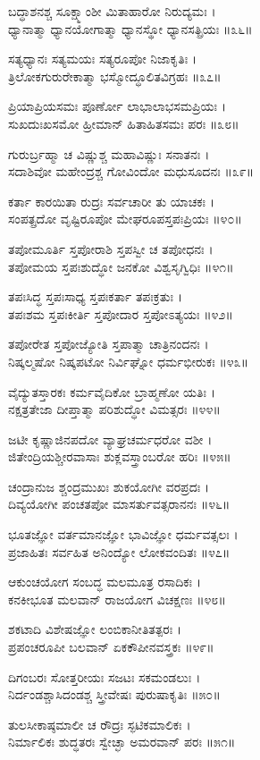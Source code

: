ಬದ್ಧಾಶನಶ್ಚ ಸೂಕ್ಷ್ಮಾಂಶೀ ಮಿತಾಹಾರೋ ನಿರುದ್ಯಮಃ ।\\
ಧ್ಯಾನಾತ್ಮಾ ಧ್ಯಾನಯೋಗಾತ್ಮಾ ಧ್ಯಾನಸ್ಥೋ ಧ್ಯಾನಸತ್ಪ್ರಿಯಃ ॥೩೬॥

ಸತ್ಯಧ್ಯಾನಃ ಸತ್ಯಮಯಃ ಸತ್ಯರೂಪೋ ನಿಜಾಕೃತಿಃ ।\\
ತ್ರಿಲೋಕಗುರುರೇಕಾತ್ಮಾ ಭಸ್ಮೋದ್ಧೂಲಿತವಿಗ್ರಹಃ ॥೩೭॥

ಪ್ರಿಯಾಪ್ರಿಯಸಮಃ ಪೂರ್ಣೋ ಲಾಭಾಲಾಭಸಮಪ್ರಿಯಃ ।\\
ಸುಖದುಃಖಸಮೋ ಹ್ರೀಮಾನ್ ಹಿತಾಹಿತಸಮಃ ಪರಃ ॥೩೮॥

ಗುರುರ್ಬ್ರಹ್ಮಾ ಚ ವಿಷ್ಣುಶ್ಚ ಮಹಾವಿಷ್ಣುಃ ಸನಾತನಃ ।\\
ಸದಾಶಿವೋ ಮಹೇಂದ್ರಶ್ಚ ಗೋವಿಂದೋ ಮಧುಸೂದನಃ ॥೩೯॥

ಕರ್ತಾ ಕಾರಯಿತಾ ರುದ್ರಃ ಸರ್ವಚಾರೀ ತು ಯಾಚಕಃ ।\\
ಸಂಪತ್ಪ್ರದೋ ವೃಷ್ಟಿರೂಪೋ ಮೇಘರೂಪಸ್ತಪಃಪ್ರಿಯಃ ॥೪೦॥

ತಪೋಮೂರ್ತಿ ಸ್ತಪೋರಾಶಿ ಸ್ತಪಸ್ವೀ ಚ ತಪೋಧನಃ ।\\
ತಪೋಮಯ ಸ್ತಪಃಶುದ್ಧೋ ಜನಕೋ ವಿಶ್ವಸೃಗ್ವಿಧಿಃ ॥೪೧॥

ತಪಃಸಿದ್ಧ ಸ್ತಪಃಸಾಧ್ಯ ಸ್ತಪಃಕರ್ತಾ ತಪಃಕ್ರತುಃ ।\\
ತಪಃಶಮ ಸ್ತಪಃಕೀರ್ತಿ ಸ್ತಪೋದಾರ ಸ್ತಪೋಽತ್ಯಯಃ ॥೪೨॥

ತಪೋರೇತ ಸ್ತಪೋಜ್ಯೋತಿ ಸ್ತಪಾತ್ಮಾ ಚಾತ್ರಿನಂದನಃ ।\\
ನಿಷ್ಕಲ್ಮಷೋ ನಿಷ್ಕಪಟೋ ನಿರ್ವಿಘ್ನೋ ಧರ್ಮಭೀರುಕಃ ॥೪೩॥

ವೈದ್ಯುತಸ್ತಾರಕಃ ಕರ್ಮವೈದಿಕೋ ಬ್ರಾಹ್ಮಣೋ ಯತಿಃ ।\\
ನಕ್ಷತ್ರತೇಜಾ ದೀಪ್ತಾತ್ಮಾ ಪರಿಶುದ್ಧೋ ವಿಮತ್ಸರಃ ॥೪೪॥

ಜಟೀ ಕೃಷ್ಣಾಜಿನಪದೋ ವ್ಯಾಘ್ರಚರ್ಮಧರೋ ವಶೀ ।\\
ಜಿತೇಂದ್ರಿಯಶ್ಚೀರವಾಸಾಃ ಶುಕ್ಲವಸ್ತ್ರಾಂಬರೋ ಹರಿಃ ॥೪೫॥

ಚಂದ್ರಾನುಜ ಶ್ಚಂದ್ರಮುಖಃ ಶುಕಯೋಗೀ ವರಪ್ರದಃ ।\\
ದಿವ್ಯಯೋಗೀ ಪಂಚತಪೋ ಮಾಸರ್ತುವತ್ಸರಾನನಃ ॥೪೬॥

ಭೂತಜ್ಞೋ ವರ್ತಮಾನಜ್ಞೋ ಭಾವಿಜ್ಞೋ ಧರ್ಮವತ್ಸಲಃ ।\\
ಪ್ರಜಾಹಿತಃ ಸರ್ವಹಿತ ಅನಿಂದ್ಯೋ ಲೋಕವಂದಿತಃ ॥೪೭॥

ಆಕುಂಚಯೋಗ ಸಂಬದ್ಧ ಮಲಮೂತ್ರ ರಸಾದಿಕಃ ।\\
ಕನಕೀಭೂತ ಮಲವಾನ್ ರಾಜಯೋಗ ವಿಚಕ್ಷಣಃ ॥೪೮॥

ಶಕಟಾದಿ ವಿಶೇಷಜ್ಞೋ ಲಂಬಿಕಾನೀತಿತತ್ಪರಃ ।\\
ಪ್ರಪಂಚರೂಪೀ ಬಲವಾನ್ ಏಕಕೌಪೀನವಸ್ತ್ರಕಃ ॥೪೯॥

ದಿಗಂಬರಃ ಸೋತ್ತರೀಯಃ ಸಜಟಃ ಸಕಮಂಡಲುಃ ।\\
ನಿರ್ದಂಡಶ್ಚಾಸಿದಂಡಶ್ಚ ಸ್ತ್ರೀವೇಷಃ ಪುರುಷಾಕೃತಿಃ ॥೫೦॥

ತುಲಸೀಕಾಷ್ಠಮಾಲೀ ಚ ರೌದ್ರಃ ಸ್ಫಟಿಕಮಾಲಿಕಃ ।\\
ನಿರ್ಮಾಲಿಕಃ ಶುದ್ಧತರಃ ಸ್ವೇಚ್ಛಾ ಅಮರವಾನ್ ಪರಃ ॥೫೧॥

